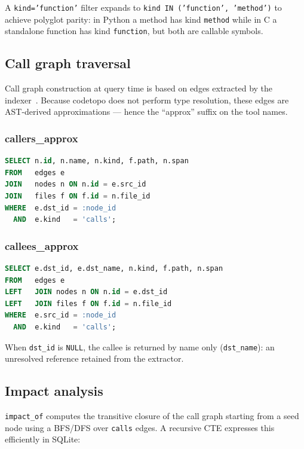 A \texttt{kind='function'} filter expands to \texttt{kind IN ('function',
'method')} to achieve polyglot parity: in Python a method has kind
\texttt{method} while in C a standalone function has kind \texttt{function},
but both are callable symbols.

\subsection{Call graph traversal}
\label{sec:qe-callgraph}

Call graph construction at query time is based on edges extracted by the
indexer~\cite{ryder1979callgraph,grove2001callgraph}. Because codetopo
does not perform type resolution, these edges are AST-derived approximations
--- hence the ``approx'' suffix on the tool names.

\subsubsection{callers\_approx}

\begin{lstlisting}[language=sql]
SELECT n.id, n.name, n.kind, f.path, n.span
FROM   edges e
JOIN   nodes n ON n.id = e.src_id
JOIN   files f ON f.id = n.file_id
WHERE  e.dst_id = :node_id
  AND  e.kind   = 'calls';
\end{lstlisting}

\subsubsection{callees\_approx}

\begin{lstlisting}[language=sql]
SELECT e.dst_id, e.dst_name, n.kind, f.path, n.span
FROM   edges e
LEFT   JOIN nodes n ON n.id = e.dst_id
LEFT   JOIN files f ON f.id = n.file_id
WHERE  e.src_id = :node_id
  AND  e.kind   = 'calls';
\end{lstlisting}

When \texttt{dst\_id} is \texttt{NULL}, the callee is returned by name only
(\texttt{dst\_name}): an unresolved reference retained from the extractor.

\subsection{Impact analysis}

\texttt{impact\_of} computes the transitive closure of the call graph starting
from a seed node using a BFS/DFS over \texttt{calls} edges. A recursive
CTE expresses this efficiently in SQLite:

